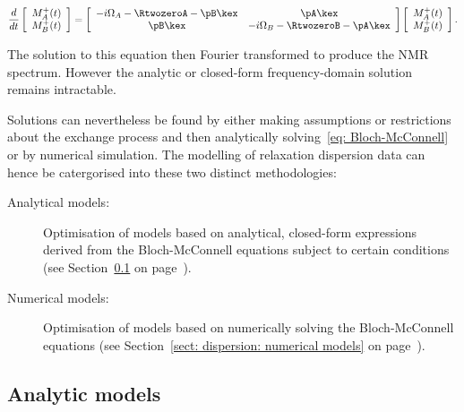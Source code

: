 \begin{equation} \label{eq: Bloch-McConnell}
    \frac{d}{dt} \left[ 
        \begin{array}{c}
            M_A^+(t) \\
            M_B^+(t)
        \end{array}
    \right] = \left[
        \begin{array}{cc}
            -i\Omega_A-\RtwozeroA-\pB\kex & \pA\kex \\
            \pB\kex & -i\Omega_B-\RtwozeroB-\pA\kex \\
        \end{array}
    \right] \left[
        \begin{array}{c}
            M_A^+(t) \\
            M_B^+(t)
        \end{array}
    \right] .
\end{equation}

The solution to this equation then Fourier transformed to produce the NMR spectrum.  However the analytic or closed-form frequency-domain solution remains intractable.

Solutions can nevertheless be found by either making assumptions or restrictions about the exchange process and then analytically solving~\ref{eq: Bloch-McConnell} or by numerical simulation.
The modelling of relaxation dispersion data can hence be catergorised into these two distinct methodologies:

\begin{description}
\item[Analytical models:]  Optimisation of models based on analytical, closed-form expressions derived from the Bloch-McConnell equations subject to certain conditions (see Section~\ref{sect: dispersion: analytic models} on page~\pageref{sect: dispersion: analytic models}).
\item[Numerical models:]  Optimisation of models based on numerically solving the Bloch-McConnell equations (see Section~\ref{sect: dispersion: numerical models} on page~\pageref{sect: dispersion: numerical models}).
\end{description}




\subsection{Analytic models}
\label{sect: dispersion: analytic models}

